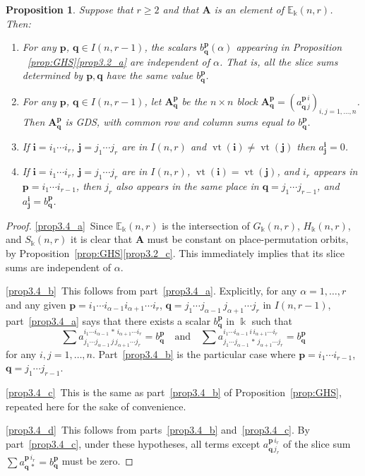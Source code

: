 \documentclass[10pt]{article}
\newtheorem{prop}[theorem]{Proposition}
\theoremstyle{definition}
\DeclareMathOperator{\vt}{vt}
\newcommand{\E}{\mathbb{E}}
\newcommand{\bi}{{\boldsymbol{i}}} %
\newcommand{\bj}{{\boldsymbol{j}}}
\newcommand{\bp}{{\boldsymbol{p}}}
\newcommand{\bq}{{\boldsymbol{q}}}
\newcommand{\qand}{\quad\text{and}\quad}
\newcommand{\bA}{\mathbf{A}}
\begin{document}
\begin{prop}\label{prop:inv-properties}
 Suppose that $r \ge 2$ and that $\bA$ is an element of
 $\E_\Bbbk(n,r)$. Then:
 \begin{enumerate}[label=(\alph*)]
 \item\label{prop3.4_a} For any $\bp$, $\bq \in I(n,r-1)$, the scalars
 $b^\bp_\bq(\alpha)$ appearing in Proposition
~\ref{prop:GHS}\ref{prop3.2_a} are
 independent of $\alpha$. That is, all the slice sums determined by
 $\bp, \bq$ have the same value $b^\bp_\bq$.
 \item\label{prop3.4_b} For any $\bp$, $\bq \in I(n,r-1)$, let $\bA^\bp_\bq$ be the $n
 \times n$ block $\bA^\bp_\bq = (a^{\bp\, i}_{\bq\, j})_{i,j = 1,
 \dots, n}$. Then $\bA^\bp_\bq$ is GDS, with common row and
 column sums equal to $b^\bp_\bq$.
 \item\label{prop3.4_c} If $\bi = i_1 \cdots i_r$, $\bj = j_1 \cdots j_r$ are in
 $I(n,r)$ and $\vt(\bi) \ne \vt(\bj)$ then $a^\bi_\bj = 0$.
 \item\label{prop3.4_d} If $\bi = i_1 \cdots i_r$, $\bj = j_1 \cdots j_r$ are in
 $I(n,r)$, $\vt(\bi) = \vt(\bj)$, and $i_r$ appears in $\bp = i_1
 \cdots i_{r-1}$, then $j_r$ also appears in the same place in $\bq
 = j_1 \cdots j_{r-1}$, and $a^\bi_\bj = b^\bp_\bq$.
 \end{enumerate}
\end{prop}

\begin{proof}
\ref{prop3.4_a}~Since $\E_\Bbbk(n,r)$ is the intersection of $G_\Bbbk(n,r)$,
$H_\Bbbk(n,r)$, and $S_\Bbbk(n,r)$ it is clear that $\bA$ must be
constant on place-permutation orbits, by Proposition~\ref{prop:GHS}\ref{prop3.2_c}. This immediately implies that its slice sums are
independent of $\alpha$.

\ref{prop3.4_b}~This follows from part~\ref{prop3.4_a}. Explicitly, for any $\alpha = 1,
\dots, r$ and any given $\bp = i_1 \cdots i_{\alpha-1} i_{\alpha+1}
\cdots i_r$, $\bq = j_1 \cdots j_{\alpha-1} \, j_{\alpha+1} \cdots
j_r$ in $I(n,r-1)$, part~\ref{prop3.4_a} says that there exists a scalar
$b^\bp_\bq$ in $\Bbbk$ such that
\[
\sum a^{i_1\cdots i_{\alpha-1} \,*\, i_{\alpha+1}\cdots
 i_r}_{j_1\cdots j_{\alpha-1} \, j \, j_{\alpha+1}\cdots j_r} =
b^\bp_\bq \qand \sum a^{i_1\cdots i_{\alpha-1} \, i \,
 i_{\alpha+1}\cdots i_r}_{j_1\cdots j_{\alpha-1} \,*\,
 j_{\alpha+1}\cdots j_r} = b^\bp_\bq
\]
for any $i,j = 1, \dots, n$. Part~\ref{prop3.4_b} is the particular case where
$\bp = i_1 \cdots i_{r-1}$, $\bq = j_1 \cdots j_{r-1}$.

\ref{prop3.4_c}~This is the same as part~\ref{prop3.4_b} of Proposition~\ref{prop:GHS}, repeated
here for the sake of convenience.

\ref{prop3.4_d}~This follows from parts~\ref{prop3.4_b} and~\ref{prop3.4_c}. By part~\ref{prop3.4_c}, under these hypotheses, all terms except $a^{\bp\,i_r}_{\bq\,j_r}$ of the slice
sum $\sum a^{\bp\,i_r}_{\bq\,*} = b^{\bp}_{\bq}$ must be zero.
\end{proof}
\end{document}
